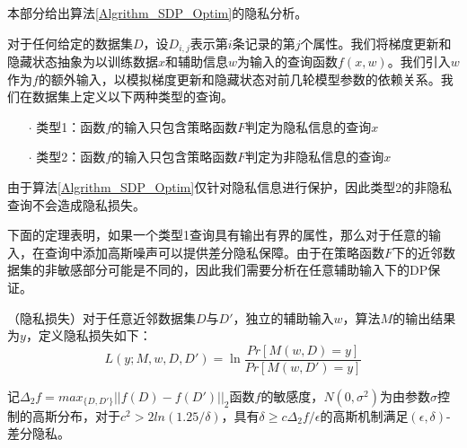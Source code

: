 本部分给出算法\ref{Algrithm_SDP_Optim}的隐私分析。


对于任何给定的数据集$D$，设$D_{i,j}$表示第$i$条记录的第$j$个属性。我们将梯度更新和隐藏状态抽象为以训练数据$x$和辅助信息$w$为输入的查询函数$f(x, w)$。我们引入$w$作为$f$的额外输入，以模拟梯度更新和隐藏状态对前几轮模型参数的依赖关系。我们在数据集上定义以下两种类型的查询。
\begin{itemize}
	\item [$\cdot$]类型1：函数$f$的输入只包含策略函数$F$判定为隐私信息的查询$x$
	\item [$\cdot$]类型2：函数$f$的输入只包含策略函数$F$判定为非隐私信息的查询$x$

\end{itemize}


由于算法\ref{Algrithm_SDP_Optim}仅针对隐私信息进行保护，因此类型2的非隐私查询不会造成隐私损失。

下面的定理表明，如果一个类型1查询具有输出有界的属性，那么对于任意的输入，在查询中添加高斯噪声可以提供差分隐私保障。由于在策略函数$F$下的近邻数据集的非敏感部分可能是不同的，因此我们需要分析在任意辅助输入下的DP保证。

\begin{definition}
	（隐私损失\cite{Algorithmic_Foundations_of_DP}）对于任意近邻数据集$D$与$D'$，独立的辅助输入$w$，算法$M$的输出结果为$y$，定义隐私损失如下：
	\begin{equation}
		L(y;M,w,D,D')=\ln\frac{Pr[M(w,D)=y]}{Pr[M(w,D')=y]}
	\end{equation}
\end{definition}

\begin{theorem} \label{guassian_mechanism}
	记$\Delta_2f=max_{\{D,D'\}}||f(D)-f(D')||_2$函数$f$的敏感度，$N(0,\sigma^2)$为由参数$\sigma$控制的高斯分布，对于$c^2>2ln(1.25/\delta)$，具有$\delta\geq c\Delta_2f/\epsilon$的高斯机制满足$(\epsilon,\delta)$-差分隐私。
\end{theorem}

